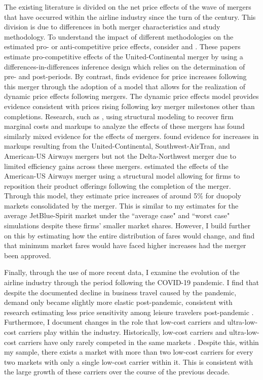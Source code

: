 \documentclass{article}
\begin{document}

    The existing literature is divided on the net price effects of the wave of mergers that have occurred within the airline industry since the turn of the century. This division is due to differences in both merger characteristics and study methodology. To understand the impact of different methodologies on the estimated pro- or anti-competitive price effects, consider \citet{luo_price_2014} and \citet{carlton_are_2019}. These papers estimate pro-competitive effects of the United-Continental merger by using a differences-in-differences inference design which relies on the determination of pre- and post-periods. By contrast, \citet{fan_when_2020} finds evidence for price increases following this merger through the adoption of a model that allows for the realization of dynamic price effects following mergers. The dynamic price effects model provides evidence consistent with prices rising following key merger milestones other than completions. Research, such as \citet{bet_retrospective_2021, ciliberto_market_2021}, using structural modeling to recover firm marginal costs and markups to analyze the effects of these mergers has found similarly mixed evidence for the effects of mergers. \citet{bet_retrospective_2021} found evidence for increases in markups resulting from the United-Continental, Southwest-AirTran, and American-US Airways mergers but not the Delta-Northwest merger due to limited efficiency gains across these mergers. \citet{ciliberto_market_2021} estimated the effects of the American-US Airways merger using a structural model allowing for firms to reposition their product offerings following the completion of the merger. Through this model, they estimate price increases of around 5\% for duopoly markets consolidated by the merger. This is similar to my estimates for the average JetBlue-Spirit market under the ``average case" and ``worst case" simulations despite these firms' smaller market shares. However, I build further on this by estimating how the entire distribution of fares would change, and find that minimum market fares would have faced higher increases had the merger been approved. %


    Finally, through the use of more recent data, I examine the evolution of the airline industry through the period following the COVID-19 pandemic. I find that despite the documented decline in business travel caused by the pandemic, demand only became slightly more elastic post-pandemic, consistent with research estimating less price sensitivity among leisure travelers post-pandemic \citep{ewen_zoom_2023}. Furthermore, I document changes in the role that low-cost carriers and ultra-low-cost carriers play within the industry. Historically, low-cost carriers and ultra-low-cost carriers have only rarely competed in the same markets \citep{ciliberto_market_2021}. Despite this, within my sample, there exists a market with more than two low-cost carriers for every two markets with only a single low-cost carrier within it. This is consistent with the large growth of these carriers over the course of the previous decade.
    
\end{document}
